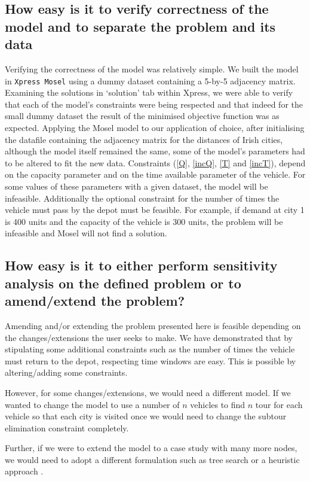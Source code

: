 \documentclass[a4paper,11pt]{article}
\begin{document}
\subsection{How easy is it to verify correctness of the model and to separate the problem and its data}
Verifying the correctness of the model was relatively simple. We built the model in \texttt{Xpress Mosel} using a dummy dataset containing a 5-by-5 adjacency matrix. Examining the solutions in `solution' tab within Xpress, we were able to verify that each of the model's constraints were being respected and that indeed for the small dummy dataset the result of the minimised objective function was as expected. Applying the Mosel model to our application of choice, after initialising the datafile containing the adjacency matrix for the distances of Irish cities, although the model itself remained the same, some of the model's parameters had to be altered to fit the new data. Constraints (\ref{Q}, \ref{incQ}, \ref{T} and \ref{incT}), depend on the capacity parameter and on the time available parameter of the vehicle. For some values of these parameters with a given dataset, the model will be infeasible. Additionally the optional constraint for the number of times the vehicle must pass by the depot must be feasible. For example, if demand at city 1 is 400 units and the capacity of the vehicle is 300 units, the problem will be infeasible and Mosel will not find a solution.

\subsection{How easy is it to either perform sensitivity analysis on the defined problem or to
amend/extend the problem? }

Amending and/or extending the problem presented here is feasible depending on the changes/extensions the user seeks to make. We have demonstrated that by stipulating some additional constraints such as the number of times the vehicle must return to the depot, respecting time windows are easy. This is possible by altering/adding some constraints. 

However, for some changes/extensions, we would need a different model. If we wanted to change the model to use a number of $n$ vehicles to find $n$ tour for each vehicle so that each city is visited once we would need to change the subtour elimination constraint completely. 

Further, if we were to extend the model to a case study with many more nodes, we would need to adopt a different formulation such as tree search or a heuristic approach \cite{gueret1999applications}.
\end{document}
